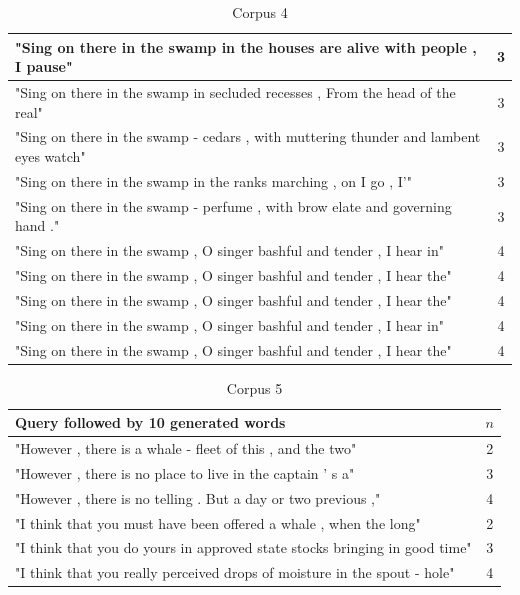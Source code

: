 \documentclass[a4paper,12pt]{article}
\begin{document}
\begin{table}
\begin{tabular}{| l |c|}
"Sing on there in the swamp in the houses are alive with people , I pause" & 3 \\ \hline
"Sing on there in the swamp in secluded recesses , From the head of the real" & 3 \\ \hline
"Sing on there in the swamp - cedars , with muttering thunder and lambent eyes watch" & 3 \\ \hline
"Sing on there in the swamp in the ranks marching , on I go , I'" & 3 \\ \hline
"Sing on there in the swamp - perfume , with brow elate and governing hand ." & 3 \\ \hline

"Sing on there in the swamp , O singer bashful and tender , I hear in" & 4 \\ \hline
"Sing on there in the swamp , O singer bashful and tender , I hear the" & 4 \\ \hline
"Sing on there in the swamp , O singer bashful and tender , I hear the" & 4 \\ \hline
"Sing on there in the swamp , O singer bashful and tender , I hear in" & 4 \\ \hline
"Sing on there in the swamp , O singer bashful and tender , I hear the" & 4 \\ \hline

\end{tabular}
\caption{ Corpus 4}
\label{tab:corpus4}
\end{table}


\begin{table}
\begin{tabular}{| l |c|}
\hline
Query followed by 10 generated words & $n$ \\ \hline
"However , there is a whale - fleet of this , and the two" & 2\\ \hline
"However , there is no place to live in the captain ' s a"& 3 \\ \hline
"However , there is no telling . But a day or two previous ," & 4 \\ \hline
"I think that you must have been offered a whale , when the long" & 2\\ \hline
"I think that you do yours in approved state stocks bringing in good time"& 3 \\ \hline
"I think that you really perceived drops of moisture in the spout - hole" & 4 \\ \hline
\end{tabular}
\caption{Corpus 5}
\label{tab:corpus5}
\end{table}
\end{document}
